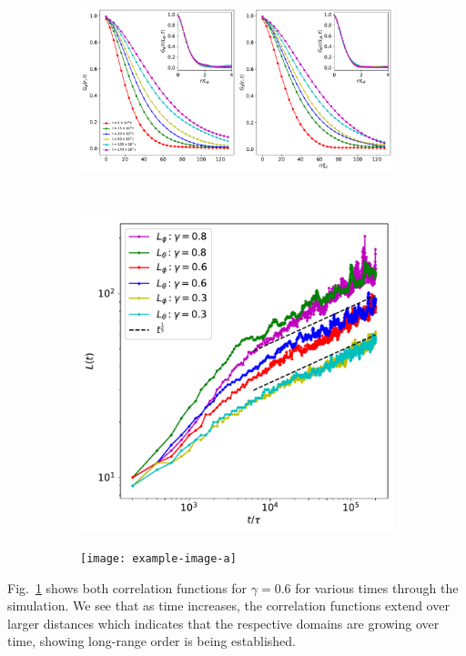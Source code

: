 \begin{figure}
    \begin{subfigure}{\textwidth}
        \centering
        \includegraphics[width=\textwidth]{
            gfx/ch-twoCompDynamics/correlations.pdf}
        \caption{\label{fig:correlation-functions}}
    \end{subfigure}\\
    \begin{subfigure}{0.5\textwidth}
        \centering
        \includegraphics[width=\textwidth]{
            gfx/ch-twoCompDynamics/correlation_lengths.pdf}
        \caption{\label{fig:correlation-lengths}}
    \end{subfigure}
    \begin{subfigure}{0.5\textwidth}
        \centering
        \texttt{[image: example-image-a]}
        \caption{\label{fig:scalar-vortex-lengths}}
    \end{subfigure}
    \caption{}
\end{figure}
Fig.~\ref{fig:correlation-functions} shows both correlation functions for
\(\gamma=0.6\) for various times through the simulation.
We see that as time increases, the correlation functions extend over larger
distances which indicates that the respective domains are growing over time,
showing long-range order is being established.

